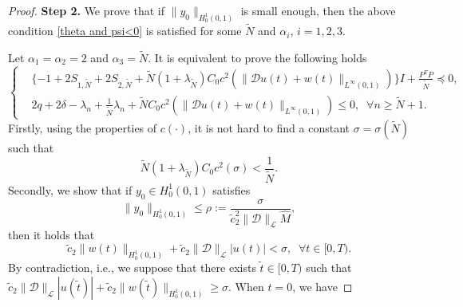 \documentclass[review]{elsarticle}
\numberwithin{equation}{section}
\begin{document}
\begin{proof}
\noindent \textbf{Step 2.} We prove that if $\|y_0\|_{H^1_0(0,1)}$ is small enough, then the above condition \eqref{theta and psi<0} is satisfied for some $\tilde{N}$ and $\alpha_i$, $i=1,2,3$.


  Let $\alpha_1=\alpha_2=2$ and $\alpha_3=\tilde{N}$. It is equivalent to prove the following holds 
\begin{equation}
\label{equivalent-LMIs}
\left\{\begin{aligned}
    &\{-1+ 2S_{1,\tilde{N}}+2S_{2,\tilde{N}}+\tilde{N}(1+\lambda_{\tilde{N}}) C_0c^2(\|\mathcal{D}u(t)+w(t)\|_{L^{\infty}(0,1)})\} I +\frac{P^TP}{\tilde{N}}\preceq 0,\\[2mm]
   & 2q+2\delta-\lambda_n+\frac{1}{\tilde{N}}\lambda_n+\tilde{N}C_0 c^2(\|\mathcal{D}u(t)+w(t)\|_{L^{\infty}(0,1)})\le 0,\;\;\forall n\ge \tilde{N}+1.
    \end{aligned}\right.
\end{equation}
Firstly, using the properties of $c(\cdot)$, it is not hard to find a constant $\sigma=\sigma(\tilde{N})$ such that
\begin{equation}\label{sigma}
   \tilde{N}(1+\lambda_{\tilde{N}}) C_0 c^2(\sigma)<\frac{1}{\tilde{N}}.
\end{equation}
Secondly, we show that if $y_0\in H^1_0(0,1)$ satisfies 
\begin{equation}
\label{rho}
    \|y_0\|_{H^1_0(0,1)}\le\rho:=\frac{\sigma}{\tilde{c}_2^2\|\mathcal{D}\|_{\mathcal{L}}\hat{M}},
\end{equation}
then it holds that
\begin{equation*}
\label{bound}
   \tilde{c}_2\|w(t)\|_{H^1_0(0,1)}+\tilde{c}_2\|\mathcal{D}\|_{\mathcal{L}}|u(t)| <{\sigma} ,\;\; \forall t\in [0,T).
  \end{equation*}
By contradiction, i.e., we suppose that there exists $\tilde{t}\in [0,T)$ such that $   \tilde{c}_2\|\mathcal{D}\|_{\mathcal{L}}|u(\tilde{t})|+   \tilde{c}_2\|w(\tilde{t})\|_{H^1_0(0,1)}\ge \sigma$. When $t=0$, we have

\end{proof}
\end{document}
